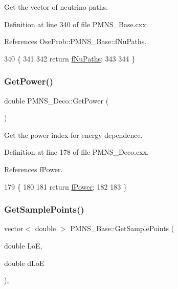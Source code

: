 Get the vector of neutrino paths. 

Definition at line 340 of file P\+M\+N\+S\+\_\+\+Base.\+cxx.



References Osc\+Prob\+::\+P\+M\+N\+S\+\_\+\+Base\+::f\+Nu\+Paths.


\begin{DoxyCode}
340                                  \{
341 
342   \textcolor{keywordflow}{return} \hyperlink{classOscProb_1_1PMNS__Base_a69db9d57e12fc7cbe0431bc6c18fac93}{fNuPaths};
343 
344 \}
\end{DoxyCode}
\mbox{\label{classOscProb_1_1PMNS__Deco_aa40b92e0f204f499a24b18ba399b8b0e}} 
\subsubsection{\texorpdfstring{Get\+Power()}{GetPower()}}
{\footnotesize\ttfamily double P\+M\+N\+S\+\_\+\+Deco\+::\+Get\+Power (\begin{DoxyParamCaption}{ }\end{DoxyParamCaption})\hspace{0.3cm}{\ttfamily [virtual]}}

Get the power index for energy dependence. 

Definition at line 178 of file P\+M\+N\+S\+\_\+\+Deco.\+cxx.



References f\+Power.


\begin{DoxyCode}
179 \{
180 
181   \textcolor{keywordflow}{return} \hyperlink{classOscProb_1_1PMNS__Deco_a19fdcdf9a8b2bd9677f72ca1fd77dc3e}{fPower};
182   
183 \}
\end{DoxyCode}
\mbox{\label{classOscProb_1_1PMNS__Base_a9eac8d768c1424755ee41f7e783af179}} 
\subsubsection{\texorpdfstring{Get\+Sample\+Points()}{GetSamplePoints()}}
{\footnotesize\ttfamily vector$<$ double $>$ P\+M\+N\+S\+\_\+\+Base\+::\+Get\+Sample\+Points (\begin{DoxyParamCaption}\item[{double}]{LoE,  }\item[{double}]{d\+LoE }\end{DoxyParamCaption})\hspace{0.3cm}{\ttfamily [virtual]}, {\ttfamily [inherited]}}

